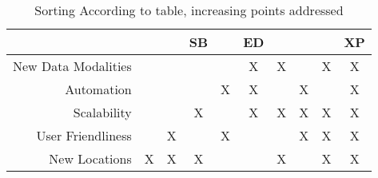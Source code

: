 
\begin{table}
    \centering 
    \begin{tabular}{r|ccccccccc}
         &  \cite{Geckeler2022a} & \cite{Geckeler2023b} & SB & \cite{Geckeler2024} & ED & \cite{Geckeler2023a} & \cite{Geckeler2024a} & \cite{Kirchgeorg2024} & XP \\
         \hline \hline
         New Data Modalities    &   &   &   &   & X & X &   & X & X\\
         \hline
         Automation             &   &   &   & X & X &   & X &   & X\\
         \hline
         Scalability            &   &   & X &   & X & X & X & X & X\\
         \hline
         User Friendliness      &   & X &   & X &   &   & X & X & X\\
         \hline
         New Locations          & X & X & X &   &   & X  &   & X & X\\
    \end{tabular}
    \caption{Sorting According to table, increasing points addressed}
    \label{tab:my_label}
\end{table}

